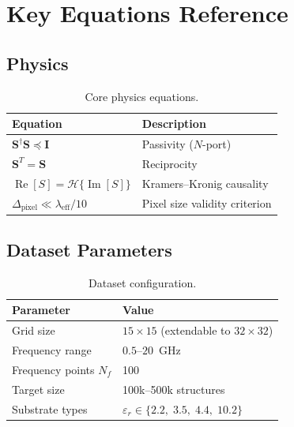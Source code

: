 \documentclass[12pt,a4paper]{article}
\newcommand{\Smat}{\mathbf{S}}
\newcommand{\Real}{\operatorname{Re}}
\newcommand{\Imag}{\operatorname{Im}}
\newcommand{\Hilbert}{\mathcal{H}}
\theoremstyle{definition}
\theoremstyle{plain}
\theoremstyle{remark}
\begin{document}
\appendix

\section{Key Equations Reference}
\label{app:equations}

\subsection{Physics}

\begin{table}[H]
\centering
\caption{Core physics equations.}
\label{tab:app_physics}
\begin{tabular}{ll}
\toprule
\textbf{Equation} & \textbf{Description} \\
\midrule
$\Smat^\dagger\Smat \preceq \mathbf{I}$ & Passivity ($N$-port) \\
$\Smat^T = \Smat$ & Reciprocity \\
$\Real[S] = \Hilbert\{\Imag[S]\}$ & Kramers--Kronig causality \\
$\Delta_{\mathrm{pixel}} \ll \lambda_{\mathrm{eff}}/10$ & Pixel size validity criterion \\
\bottomrule
\end{tabular}
\end{table}

\subsection{Dataset Parameters}

\begin{table}[H]
\centering
\caption{Dataset configuration.}
\label{tab:app_dataset}
\begin{tabular}{ll}
\toprule
\textbf{Parameter} & \textbf{Value} \\
\midrule
Grid size          & $15\times15$ (extendable to $32\times32$) \\
Frequency range    & $0.5$--$20$~GHz \\
Frequency points $N_f$ & 100 \\
Target size        & 100k--500k structures \\
Substrate types    & $\varepsilon_r \in \{2.2,\; 3.5,\; 4.4,\; 10.2\}$ \\
\bottomrule
\end{tabular}
\end{table}
\end{document}
